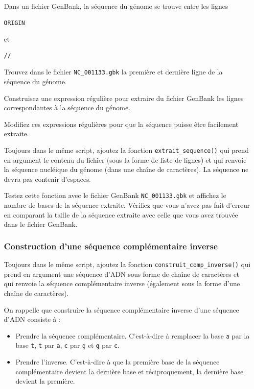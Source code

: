 \documentclass[a4paper,11pt,twoside]{book}
\providecommand{\tightlist}{%
  \setlength{\itemsep}{0pt}\setlength{\parskip}{0pt}}
\begin{document}
Dans un fichier GenBank, la séquence du génome se trouve entre les
lignes

\begin{verbatim}
ORIGIN  
\end{verbatim}

et

\begin{verbatim}
//
\end{verbatim}

Trouvez dans le fichier \texttt{NC\_001133.gbk} la première et dernière
ligne de la séquence du génome.

Construisez une expression régulière pour extraire du fichier GenBank
les lignes correspondantes à la séquence du génome.

Modifiez ces expressions régulières pour que la séquence puisse être
facilement extraite.

Toujours dans le même script, ajoutez la fonction
\texttt{extrait\_sequence()} qui prend en argument le contenu du fichier
(sous la forme de liste de lignes) et qui renvoie la séquence nucléique
du génome (dans une chaîne de caractères). La séquence ne devra pas
contenir d'espaces.

Testez cette fonction avec le fichier GenBank \texttt{NC\_001133.gbk} et
affichez le nombre de bases de la séquence extraite. Vérifiez que vous
n'avez pas fait d'erreur en comparant la taille de la séquence extraite
avec celle que vous avez trouvée dans le fichier GenBank.

\subsubsection{Construction d'une séquence complémentaire
inverse}\label{construction-dune-suxe9quence-compluxe9mentaire-inverse-1}

Toujours dans le même script, ajoutez la fonction
\texttt{construit\_comp\_inverse()} qui prend en argument une séquence
d'ADN sous forme de chaîne de caractères et qui renvoie la séquence
complémentaire inverse (également sous la forme d'une chaîne de
caractères).

On rappelle que construire la séquence complémentaire inverse d'une
séquence d'ADN consiste à :

\begin{itemize}
\tightlist
\item
  Prendre la séquence complémentaire. C'est-à-dire à remplacer la base
  \texttt{a} par la base \texttt{t}, \texttt{t} par \texttt{a},
  \texttt{c} par \texttt{g} et \texttt{g} par \texttt{c}.
\item
  Prendre l'inverse. C'est-à-dire à que la première base de la séquence
  complémentaire devient la dernière base et réciproquement, la dernière
  base devient la première.
\end{itemize}
\end{document}
